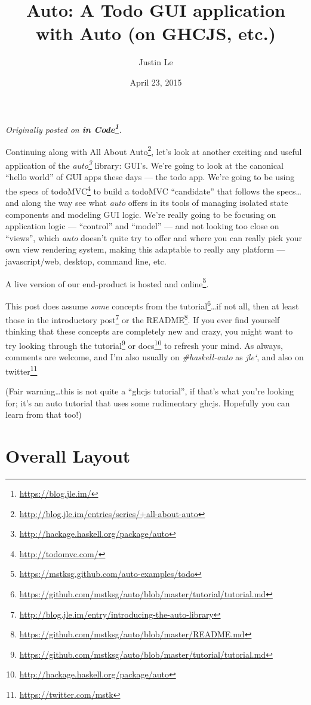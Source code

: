 \documentclass[]{article}
\title{Auto: A Todo GUI application with Auto (on GHCJS, etc.)}
\author{Justin Le}
\date{April 23, 2015}
\renewcommand{\href}[2]{#2\footnote{\url{#1}}}
\begin{document}
\maketitle

\emph{Originally posted on \textbf{\href{https://blog.jle.im/}{in
Code}}.}

Continuing along with
\href{http://blog.jle.im/entries/series/+all-about-auto}{All About
Auto}, let's look at another exciting and useful application of the
\emph{\href{http://hackage.haskell.org/package/auto}{auto}} library:
GUI's. We're going to look at the canonical ``hello world'' of GUI apps
these days --- the todo app. We're going to be using the specs of
\href{http://todomvc.com/}{todoMVC} to build a todoMVC ``candidate''
that follows the specs\ldots{}and along the way see what \emph{auto}
offers in its tools of managing isolated state components and modeling
GUI logic. We're really going to be focusing on application logic ---
``control'' and ``model'' --- and not looking too close on ``views'',
which \emph{auto} doesn't quite try to offer and where you can really
pick your own view rendering system, making this adaptable to really any
platform --- javascript/web, desktop, command line, etc.

A live version of our end-product
\href{https://mstksg.github.com/auto-examples/todo}{is hosted and
online}.

This post does assume \emph{some} concepts from the
\href{https://github.com/mstksg/auto/blob/master/tutorial/tutorial.md}{tutorial}\ldots{}if
not all, then at least those in the
\href{http://blog.jle.im/entry/introducing-the-auto-library}{introductory
post} or the
\href{https://github.com/mstksg/auto/blob/master/README.md}{README}. If
you ever find yourself thinking that these concepts are completely new
and crazy, you might want to try looking through the
\href{https://github.com/mstksg/auto/blob/master/tutorial/tutorial.md}{tutorial}
or \href{http://hackage.haskell.org/package/auto}{docs} to refresh your
mind. As always, comments are welcome, and I'm also usually on
\emph{\#haskell-auto} as \emph{jle`}, and also on
\href{https://twitter.com/mstk}{twitter}

(Fair warning\ldots{}this is not quite a ``ghcjs tutorial'', if that's
what you're looking for; it's an auto tutorial that uses some
rudimentary ghcjs. Hopefully you can learn from that too!)

\section{Overall Layout}\label{overall-layout}
\end{document}
